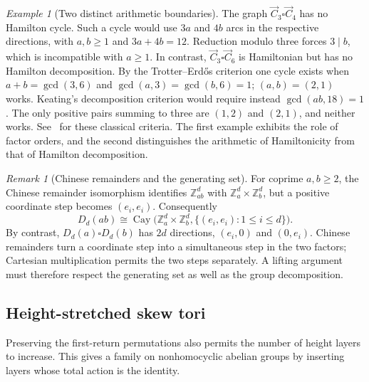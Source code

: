 \documentclass[11pt,reqno]{amsart}
\numberwithin{equation}{section}
\theoremstyle{definition}
\theoremstyle{remark}
\newtheorem{remark}[theorem]{Remark}
\newtheorem{example}[theorem]{Example}
\newcommand{\Z}{\mathbb Z}
\newcommand{\Cay}{\operatorname{Cay}}
\begin{document}
\begin{example}[Two distinct arithmetic boundaries]\label{ex:two-factor-boundary}
The graph $\vec C_3\square\vec C_4$ has no Hamilton cycle. Such a cycle
would use $3a$ and $4b$ arcs in the respective directions, with $a,b\ge1$
and $3a+4b=12$. Reduction modulo three forces $3\mid b$, which is
incompatible with $a\ge1$.
In contrast, $\vec C_3\square\vec C_6$ is Hamiltonian but has no Hamilton
decomposition. By the Trotter--Erd\H{o}s criterion one cycle exists when
$a+b=\gcd(3,6)$ and $\gcd(a,3)=\gcd(b,6)=1$; $(a,b)=(2,1)$ works.
Keating's decomposition criterion would require instead
$\gcd(ab,18)=1$. The only positive pairs summing to three are $(1,2)$
and $(2,1)$, and neither works. See~\cite[Theorems~2.1 and~2.3]{DMM22}
for these classical criteria. The first example exhibits the role of
factor orders, and the second distinguishes the arithmetic of
Hamiltonicity from that of Hamilton decomposition.
\end{example}

\begin{remark}[Chinese remainders and the generating set]\label{rem:crt-graph}
For coprime $a,b\ge2$, the Chinese remainder isomorphism identifies
$\Z_{ab}^d$ with $\Z_a^d\times\Z_b^d$, but a positive coordinate step
becomes $(e_i,e_i)$. Consequently
\[
 D_d(ab)\cong\Cay\bigl(\Z_a^d\times\Z_b^d,
                       \{(e_i,e_i):1\le i\le d\}\bigr).
\]
By contrast, $D_d(a)\square D_d(b)$ has $2d$ directions,
$(e_i,0)$ and $(0,e_i)$. Chinese remainders turn a coordinate step into
a simultaneous step in the two factors; Cartesian multiplication
permits the two steps separately. A lifting argument must therefore
respect the generating set as well as the group decomposition.
\end{remark}

\subsection{Height-stretched skew tori}
Preserving the first-return permutations also permits the number of
height layers to increase. This gives a family on nonhomocyclic abelian
groups by inserting layers whose total action is the identity.
\end{document}
